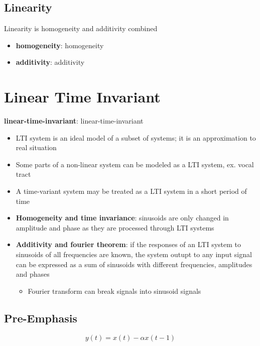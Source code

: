   \subsection{Linearity}

    Linearity is \gls{homogeneity} and \gls{additivity} combined

    \begin{itemize}
      \item \textbf{\Gls{homogeneity}}: \glsdesc{homogeneity}
      \item \textbf{\Gls{additivity}}: \glsdesc{additivity}
    \end{itemize}

\section{Linear Time Invariant}

  \textbf{\Gls{linear-time-invariant}}: \glsdesc{linear-time-invariant}

  \begin{itemize}
    \item LTI system is an ideal model of a subset of systems; it is an
    approximation to real situation
    \item Some parts of a non-linear system can be modeled as a LTI system,
    ex. vocal tract
    \item A time-variant system may be treated as a LTI system in a short
    period of time
    \item \textbf{Homogeneity and time invariance}: sinusoids are only changed
    in amplitude and phase as they are processed through LTI systems
    \item \textbf{Additivity and fourier theorem}: if the responses of an
    LTI system to sinusoids of all frequencies are known, the system outupt
    to any input signal can be expressed as a sum of sinusoids with different
    frequencies, amplitudes and phases
    \begin{itemize}
      \item Fourier transform can break signals into sinusoid signals
    \end{itemize}
  \end{itemize}

  \subsection{Pre-Emphasis}

    \begin{equation}
      y\left( t \right) = x\left( t \right) - \alpha x\left( t - 1\right)
    \end{equation}

